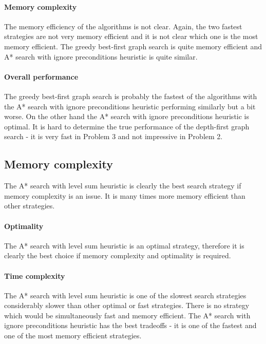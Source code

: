 \documentclass[11pt]{article}
\begin{document}
\paragraph{Memory complexity}

The memory efficiency of the algorithms is not clear. Again, the two fastest strategies are not very memory efficient and it is not clear which one is the most memory efficient. The greedy best-first graph search is quite memory efficient and A* search with ignore preconditions heuristic is quite similar. 

\paragraph{Overall performance}

The greedy best-first graph search is probably the fastest of the algorithms with the A* search with ignore preconditions heuristic performing similarly but a bit worse. On the other hand the A* search with ignore preconditions heuristic is optimal. It is hard to determine the true performance of the depth-first graph search - it is very fast in Problem 3 and not impressive in Problem 2.

\subsection{Memory complexity}

The A* search with level sum heuristic is clearly the best search strategy if memory complexity is an issue. It is many times more memory efficient than other strategies.

\paragraph{Optimality}

The A* search with level sum heuristic is an optimal strategy, therefore it is clearly the best choice if memory complexity and optimality is required.

\paragraph{Time complexity}

The A* search with level sum heuristic is one of the slowest search strategies considerably slower than other optimal or fast strategies. There is no strategy which would be simultaneously fast and memory efficient. The A* search with ignore preconditions heuristic has the best tradeoffs - it is one of the fastest and one of the most memory efficient strategies. 
\end{document}
